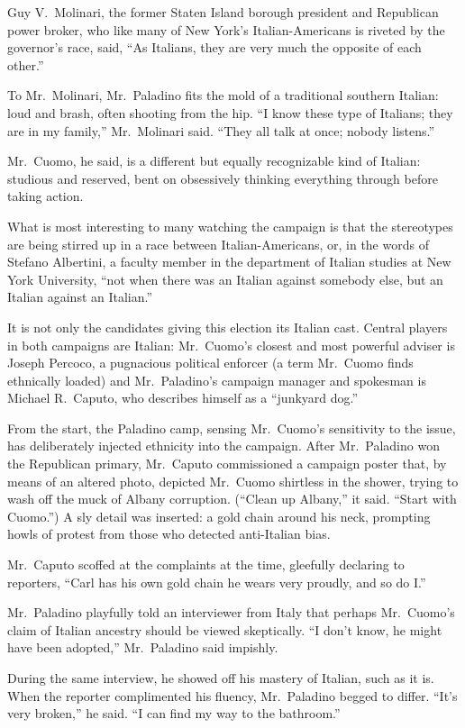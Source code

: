 ﻿\documentclass[12pt]{article}
\begin{document}
Guy V.~Molinari, the former Staten Island borough president and Republican power broker, who like
many of New York's Italian-Americans is riveted by the governor's race, said, ``As Italians, they
are very much the opposite of each other.''

To Mr.~Molinari, Mr.~Paladino fits the mold of a traditional southern Italian: loud and brash, often
shooting from the hip. ``I know these type of Italians; they are in my family,'' Mr.~Molinari said.
``They all talk at once; nobody listens.''

Mr.~Cuomo, he said, is a different but equally recognizable kind of Italian: studious and reserved,
bent on obsessively thinking everything through before taking action.

What is most interesting to many watching the campaign is that the stereotypes are being stirred up
in a race between Italian-Americans, or, in the words of Stefano Albertini, a faculty member in the
department of Italian studies at New York University, ``not when there was an Italian against
somebody else, but an Italian against an Italian.''

It is not only the candidates giving this election its Italian cast. Central players in both
campaigns are Italian: Mr.~Cuomo's closest and most powerful adviser is Joseph Percoco, a pugnacious
political enforcer (a term Mr.~Cuomo finds ethnically loaded) and Mr.~Paladino's campaign manager
and spokesman is Michael R.~Caputo, who describes himself as a ``junkyard dog.''

From the start, the Paladino camp, sensing Mr.~Cuomo's sensitivity to the issue, has deliberately
injected ethnicity into the campaign. After Mr.~Paladino won the Republican primary, Mr.~Caputo
commissioned a campaign poster that, by means of an altered photo, depicted Mr.~Cuomo shirtless in
the shower, trying to wash off the muck of Albany corruption. (``Clean up Albany,'' it said. ``Start
with Cuomo.'') A sly detail was inserted: a gold chain around his neck, prompting howls of protest
from those who detected anti-Italian bias.

Mr.~Caputo scoffed at the complaints at the time, gleefully declaring to reporters, ``Carl has his
own gold chain he wears very proudly, and so do I.''

Mr.~Paladino playfully told an interviewer from Italy that perhaps Mr.~Cuomo's claim of Italian
ancestry should be viewed skeptically. ``I don't know, he might have been adopted,'' Mr.~Paladino
said impishly.

During the same interview, he showed off his mastery of Italian, such as it is. When the reporter
complimented his fluency, Mr.~Paladino begged to differ. ``It's very broken,'' he said. ``I can find
my way to the bathroom.''
\end{document}
